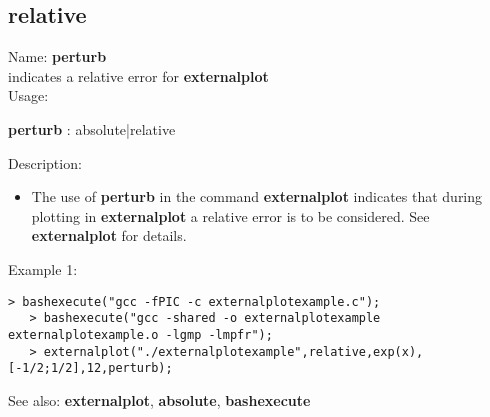 \subsection{ relative }
\noindent Name: \textbf{perturb}\\
indicates a relative error for \textbf{externalplot}\\

\noindent Usage: 
\begin{center}
\textbf{perturb} : \textsf{absolute|relative}\\
\end{center}
\noindent Description: \begin{itemize}

\item The use of \textbf{perturb} in the command \textbf{externalplot} indicates that during
   plotting in \textbf{externalplot} a relative error is to be considered.
   See \textbf{externalplot} for details.
\end{itemize}
\noindent Example 1: 
\begin{center}\begin{minipage}{14.8cm}\begin{Verbatim}[frame=single]
   > bashexecute("gcc -fPIC -c externalplotexample.c");
   > bashexecute("gcc -shared -o externalplotexample externalplotexample.o -lgmp -lmpfr");
   > externalplot("./externalplotexample",relative,exp(x),[-1/2;1/2],12,perturb);
\end{Verbatim}
\end{minipage}\end{center}
See also: \textbf{externalplot}, \textbf{absolute}, \textbf{bashexecute}
